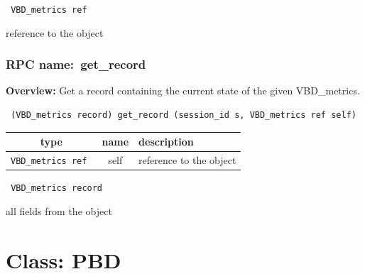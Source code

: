 \vspace{0.3cm}

{\tt 
VBD\_metrics ref
}


reference to the object
\vspace{0.3cm}
\vspace{0.3cm}
\vspace{0.3cm}
\subsubsection{RPC name:~get\_record}

{\bf Overview:} 
Get a record containing the current state of the given VBD\_metrics.

\begin{verbatim} (VBD_metrics record) get_record (session_id s, VBD_metrics ref self)\end{verbatim}



 
\vspace{0.3cm}
\begin{tabular}{|c|c|p{7cm}|}
 \hline
{\bf type} & {\bf name} & {\bf description} \\ \hline
{\tt VBD\_metrics ref } & self & reference to the object \\ \hline 

\end{tabular}

\vspace{0.3cm}

{\tt 
VBD\_metrics record
}


all fields from the object
\vspace{0.3cm}
\vspace{0.3cm}
\vspace{0.3cm}

\vspace{1cm}
\newpage
\section{Class: PBD}
